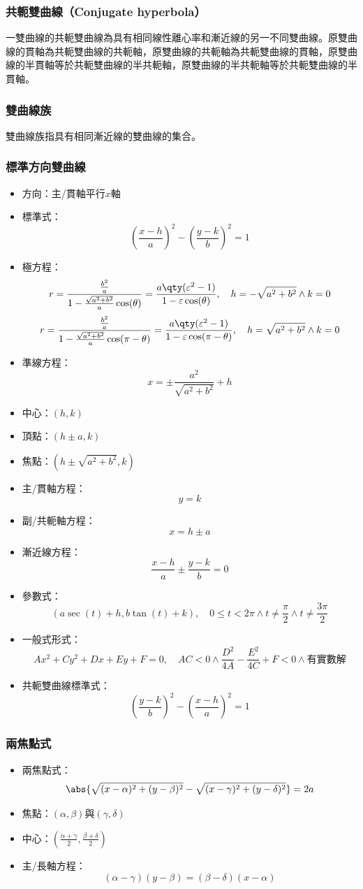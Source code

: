 \documentclass[a4paper,12pt]{article}
\begin{document}
\subsubsection{共軛雙曲線（Conjugate hyperbola）}
一雙曲線的共軛雙曲線為具有相同線性離心率和漸近線的另一不同雙曲線。原雙曲線的貫軸為共軛雙曲線的共軛軸，原雙曲線的共軛軸為共軛雙曲線的貫軸，原雙曲線的半貫軸等於共軛雙曲線的半共軛軸，原雙曲線的半共軛軸等於共軛雙曲線的半貫軸。
\subsubsection{雙曲線族}
雙曲線族指具有相同漸近線的雙曲線的集合。
\subsubsection{標準方向雙曲線}
\begin{itemize}
\item 方向：主/貫軸平行$x$軸
\item 標準式：
\[\left(\frac{x-h}{a}\right)^2-\left(\frac{y-k}{b}\right)^2=1\]
\item 極方程：
\[r=\frac{\frac{b^2}{a}}{1-\frac{\sqrt{a^2+b^2}}{a}\cos(\theta)}=\frac{a\qty(\varepsilon^2-1)}{1-\varepsilon\cos(\theta)},\quad h=-\sqrt{a^2+b^2}\land k=0\]
\[r=\frac{\frac{b^2}{a}}{1-\frac{\sqrt{a^2+b^2}}{a}\cos(\pi-\theta)}=\frac{a\qty(\varepsilon^2-1)}{1-\varepsilon\cos(\pi-\theta)},\quad h=\sqrt{a^2+b^2}\land k=0\]
\item 準線方程：
\[x=\pm\frac{a^2}{\sqrt{a^2+b^2}}+h\]
\item 中心：$(h,k)$
\item 頂點：$(h\pm a,k)$
\item 焦點：$(h\pm\sqrt{a^2+b^2},k)$
\item 主/貫軸方程：
\[y=k\]
\item 副/共軛軸方程：
\[x=h\pm a\]
\item 漸近線方程：
\[\frac{x-h}{a}\pm\frac{y-k}{b}=0\]
\item 參數式：
\[(a\sec(t)+h,b\tan(t)+k),\quad0\leq t<2\pi\land t\neq\frac{\pi}{2}\land t\neq\frac{3\pi}{2}\]
\item 一般式形式：
\[Ax^2+Cy^2+Dx+Ey+F=0,\quad AC<0\land\frac{D^2}{4A}-\frac{E^2}{4C}+F<0\land\text{有實數解}\]
\item 共軛雙曲線標準式：
\[\left(\frac{y-k}{b}\right)^2-\left(\frac{x-h}{a}\right)^2=1\]
\end{itemize}
\subsubsection{兩焦點式}
\begin{itemize}
\item 兩焦點式：
\[\abs{\sqrt{(x-\alpha)^2+(y-\beta)^2}-\sqrt{(x-\gamma)^2+(y-\delta)^2}}=2a\]
\item 焦點：$(\alpha,\beta)$與$(\gamma,\delta)$
\item 中心：$\left(\frac{\alpha+\gamma}{2},\frac{\beta+\delta}{2}\right)$
\item 主/長軸方程：
\[(\alpha-\gamma)(y-\beta)=(\beta-\delta)(x-\alpha)\]
\end{itemize}
\end{document}

